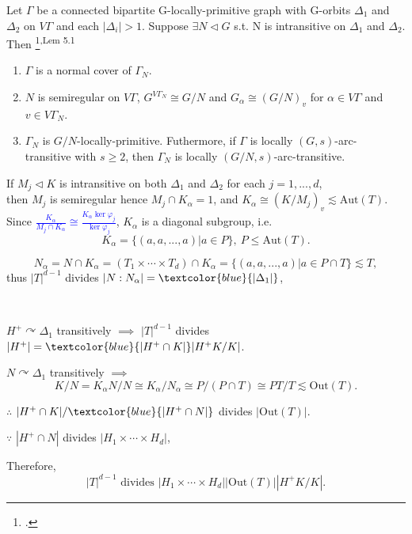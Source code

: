 \documentclass{beamer}
\def\Aut{\mathrm{Aut}}
\def\Out{\mathrm{Out}}
\begin{document}
\begin{frame}
\begin{lemma}[2.4]
Let $\Gamma$ be a connected bipartite G-locally-primitive graph with G-orbits $\Delta_1$ and $\Delta_2$ on $V\Gamma$ and each $|\Delta_i|>1$. Suppose $\exists N\triangleleft G$ s.t. N is intransitive on $\Delta_1$ and $\Delta_2$. Then \footcite{GIUDICI2003analysing}\textsuperscript{,Lem 5.1}
\begin{enumerate}
	\item $\Gamma$ is a normal cover of $\Gamma_N$.
	\item $N$ is semiregular on $V\Gamma$, $G^{V\Gamma_N}\cong G/N$ and $G_\alpha\cong(G/N)_v$ for $\alpha\in V\Gamma$ and $v\in V\Gamma_N$.
	\item $\Gamma_N$ is $G/N$-locally-primitive. Futhermore, if $\Gamma$ is locally $(G,s)$-arc- transitive with $s\geq 2$, then $\Gamma_N$ is locally $(G/N,s)$-arc-transitive.
\end{enumerate}
\end{lemma}
If $M_j\triangleleft K$ is intransitive on both $\Delta_1$ and $\Delta_2$ for each $j=1,...,d$, \\
then $M_j$ is semiregular hence $M_j\cap K_\alpha=1$, and $K_\alpha\cong (K/M_j)_v\lesssim\Aut(T)$.
Since \textcolor{blue}{$\frac{K_\alpha}{M_j\cap K_\alpha}\cong \frac{K_\alpha\ker\varphi_j}{\ker\varphi_j}$}, $K_\alpha$ is a diagonal subgroup, i.e. 
\[K_\alpha=\{(a,a,...,a)|a\in P\},\ P\leq\Aut(T).\]
\end{frame}


\begin{frame}
\[N_\alpha=N\cap K_\alpha=(T_1\times\cdots\times T_d)\cap K_\alpha=\{(a,a,...,a)|a\in P\cap T\}\lesssim T,\]
thus $|T|^{d-1}$ divides $|N:N_\alpha|=\textcolor{blue}{|\Delta_1|}$, 

\ 

$H^+\curvearrowright\Delta_1$ transitively $\implies$ $|T|^{d-1}$ divides $|H^+|=\textcolor{blue}{|H^+\cap K|}|H^+K/K|$.

$N\curvearrowright \Delta_1$ transitively $\implies$ \[K/N=K_\alpha N/N\cong K_\alpha/N_\alpha\cong P/(P\cap T)\cong PT/T\lesssim \Out(T).\]

$\therefore$ $|H^+\cap K|/\textcolor{blue}{|H^+\cap N|}$ divides $|\Out(T)|$.

$\because$ $|H^+\cap N|$ divides $|H_1\times\cdots\times H_d|$,

Therefore, \[|T|^{d-1}\text{ divides }|H_1\times\cdots\times H_d||\Out(T)||H^+K/K|.\]
\end{frame}
\end{document}
